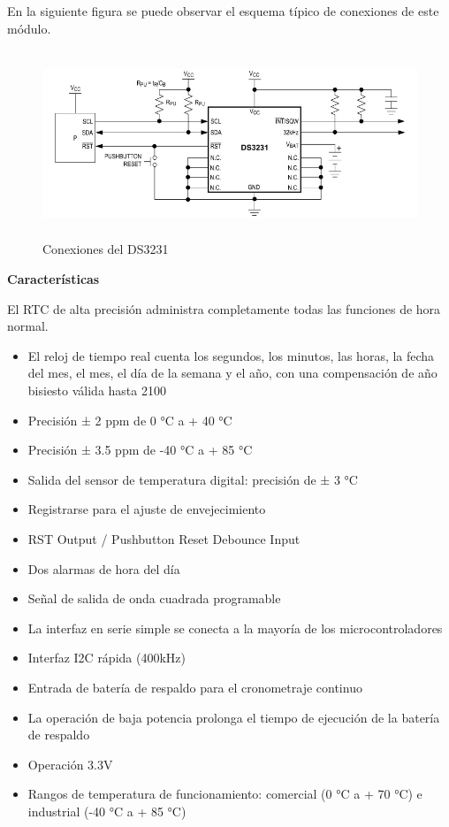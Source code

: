 \newpage

En la siguiente figura se puede observar el esquema típico de conexiones de este módulo.

\begin{figure}[H]
    \centering
    \includegraphics[width=12cm, height=5.6cm]{imagenes/conexiones RTC.jpg}
    \caption{Conexiones del DS3231}
    \label{imag:conexiones_DS3231}
\end{figure}

\textbf{Características}

El RTC de alta precisión administra completamente todas las funciones de hora normal.

\begin{itemize}
    \item El reloj de tiempo real cuenta los segundos, los minutos, las horas, la fecha del mes, el mes, el día de la semana y el año, con una compensación de año bisiesto válida hasta 2100
    \item Precisión ± 2 ppm de 0 °C a + 40 °C
    \item Precisión ± 3.5 ppm de -40 °C a + 85 °C
    \item Salida del sensor de temperatura digital: precisión de ± 3 °C
    \item Registrarse para el ajuste de envejecimiento
    \item RST Output / Pushbutton Reset Debounce Input
    \item Dos alarmas de hora del día
    \item Señal de salida de onda cuadrada programable
    \item La interfaz en serie simple se conecta a la mayoría de los microcontroladores
    \item Interfaz I2C rápida (400kHz)
    \item Entrada de batería de respaldo para el cronometraje continuo
    \item La operación de baja potencia prolonga el tiempo de ejecución de la batería de respaldo
    \item Operación 3.3V
    \item Rangos de temperatura de funcionamiento: comercial (0 °C a + 70 °C) e industrial (-40 °C a + 85 °C)
\end{itemize}

